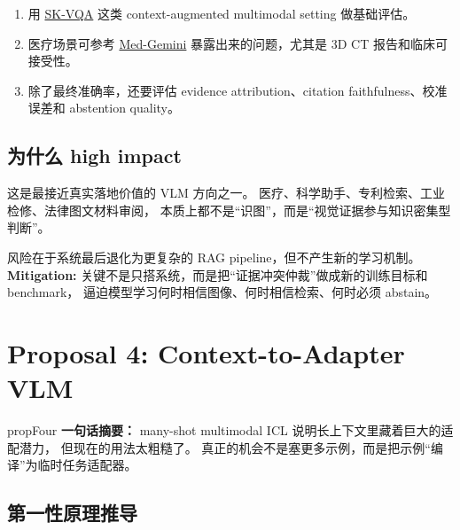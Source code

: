 \documentclass[12pt,a4paper]{article}
\begin{document}
\begin{expbox}
\begin{enumerate}[leftmargin=2em]
  \item 用 \href{https://arxiv.org/abs/2406.19593}{SK-VQA} 这类 context-augmented multimodal setting 做基础评估。
  \item 医疗场景可参考 \href{https://arxiv.org/abs/2405.03162}{Med-Gemini} 暴露出来的问题，尤其是 3D CT 报告和临床可接受性。
  \item 除了最终准确率，还要评估 evidence attribution、citation faithfulness、校准误差和 abstention quality。
\end{enumerate}
\end{expbox}

\subsection{为什么 high impact}

这是最接近真实落地价值的 VLM 方向之一。
医疗、科学助手、专利检索、工业检修、法律图文材料审阅，
本质上都不是``识图''，而是``视觉证据参与知识密集型判断''。

\begin{riskbox}
风险在于系统最后退化为更复杂的 RAG pipeline，但不产生新的学习机制。\\
\textbf{Mitigation:}
关键不是只搭系统，而是把``证据冲突仲裁''做成新的训练目标和 benchmark，
逼迫模型学习何时相信图像、何时相信检索、何时必须 abstain。
\end{riskbox}

\newpage
\section{Proposal 4: Context-to-Adapter VLM}

\begin{proposalbox}{propFour}
\textbf{一句话摘要：}
many-shot multimodal ICL 说明长上下文里藏着巨大的适配潜力，
但现在的用法太粗糙了。
真正的机会不是塞更多示例，而是把示例``编译''为临时任务适配器。
\end{proposalbox}

\subsection{第一性原理推导}
\end{document}
